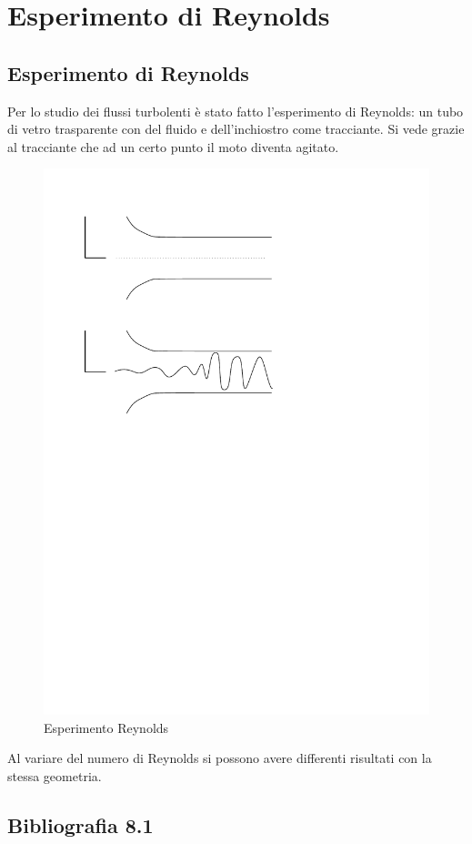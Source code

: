 %
\section{Esperimento di Reynolds} 
\subsection{Esperimento di Reynolds}
Per lo studio dei flussi turbolenti è stato fatto l'esperimento di Reynolds: un tubo di vetro trasparente con del fluido e dell'inchiostro come tracciante.
Si vede grazie  al tracciante che ad un certo punto il moto diventa agitato.
	\begin{figure}[ht]
		\includegraphics[scale=0.6]{./8.1 Esperimento di Reynolds/8.1-1}
		\centering
		\caption{Esperimento Reynolds}
	\end{figure}
%
Al variare del numero di Reynolds si possono avere differenti risultati con la stessa geometria.


\subsection*{Bibliografia 8.1}
\cite[Cap.\ 8.2]{CengelCimbala}\\
\cite[Cap.\ 12.1]{PnueliGutfinger}